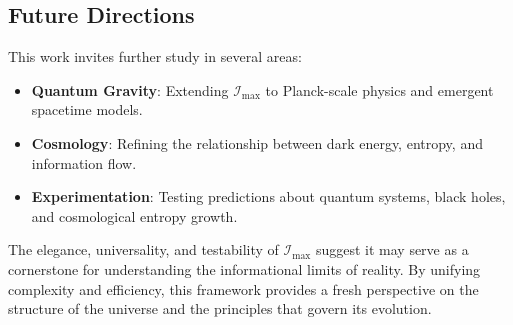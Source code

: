 \documentclass[12pt]{article}
\begin{document}
\subsection{Future Directions}
This work invites further study in several areas:
\begin{itemize}
    \item \textbf{Quantum Gravity}: Extending \( \mathcal{I}_{\text{max}} \) to Planck-scale physics and emergent spacetime models.
    \item \textbf{Cosmology}: Refining the relationship between dark energy, entropy, and information flow.
    \item \textbf{Experimentation}: Testing predictions about quantum systems, black holes, and cosmological entropy growth.
\end{itemize}

The elegance, universality, and testability of \( \mathcal{I}_{\text{max}} \) suggest it may serve as a cornerstone for understanding the informational limits of reality. By unifying complexity and efficiency, this framework provides a fresh perspective on the structure of the universe and the principles that govern its evolution.
\end{document}
